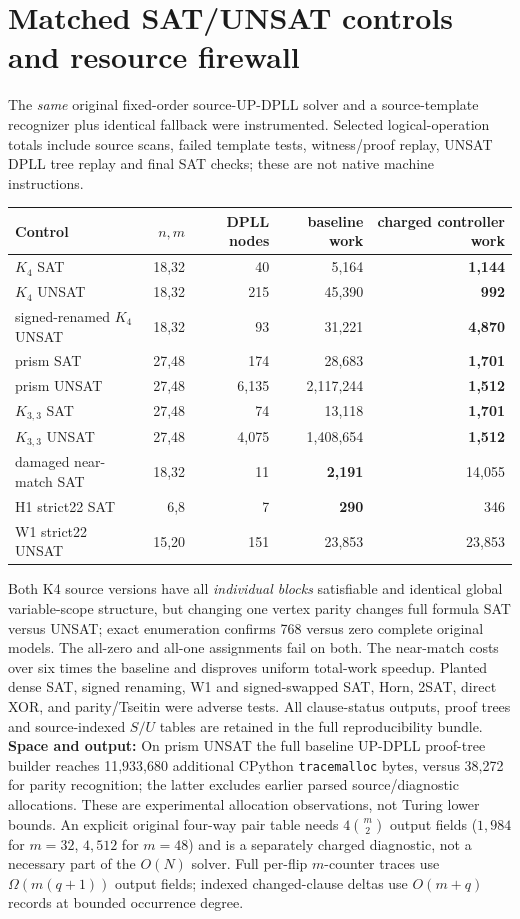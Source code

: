 \documentclass[10pt]{article}
\begin{document}
\section{Matched SAT/UNSAT controls and resource firewall}
The \emph{same} original fixed-order source-UP-DPLL solver and a source-template recognizer plus identical fallback were instrumented. Selected logical-operation totals include source scans, failed template tests, witness/proof replay, UNSAT DPLL tree replay and final SAT checks; these are not native machine instructions.
\begin{center}\small\begin{tabular}{lrrrr}\toprule
Control & $n,m$ & DPLL nodes & baseline work & charged controller work\\\midrule
$K_4$ SAT &18,32&40&5,164&\textbf{1,144}\\
$K_4$ UNSAT &18,32&215&45,390&\textbf{992}\\
signed-renamed $K_4$ UNSAT &18,32&93&31,221&\textbf{4,870}\\
prism SAT &27,48&174&28,683&\textbf{1,701}\\
prism UNSAT &27,48&6,135&2,117,244&\textbf{1,512}\\
$K_{3,3}$ SAT &27,48&74&13,118&\textbf{1,701}\\
$K_{3,3}$ UNSAT &27,48&4,075&1,408,654&\textbf{1,512}\\
damaged near-match SAT &18,32&11&\textbf{2,191}&14,055\\
H1 strict22 SAT &6,8&7&\textbf{290}&346\\
W1 strict22 UNSAT &15,20&151&23,853&23,853\\\bottomrule
\end{tabular}\end{center}
Both K4 source versions have all \emph{individual blocks} satisfiable and identical global variable-scope structure, but changing one vertex parity changes full formula SAT versus UNSAT; exact enumeration confirms 768 versus zero complete original models. The all-zero and all-one assignments fail on both. The near-match costs over six times the baseline and disproves uniform total-work speedup. Planted dense SAT, signed renaming, W1 and signed-swapped SAT, Horn, 2SAT, direct XOR, and parity/Tseitin were adverse tests. All clause-status outputs, proof trees and source-indexed $S/U$ tables are retained in the full reproducibility bundle.
\noindent\textbf{Space and output:} On prism UNSAT the full baseline UP-DPLL proof-tree builder reaches 11,933,680 additional CPython \texttt{tracemalloc} bytes, versus 38,272 for parity recognition; the latter excludes earlier parsed source/diagnostic allocations. These are experimental allocation observations, not Turing lower bounds. An explicit original four-way pair table needs $4\binom m2$ output fields ($1,984$ for $m=32$, $4,512$ for $m=48$) and is a separately charged diagnostic, not a necessary part of the $O(N)$ solver. Full per-flip $m$-counter traces use $\Omega(m(q+1))$ output fields; indexed changed-clause deltas use $O(m+q)$ records at bounded occurrence degree.
\end{document}
